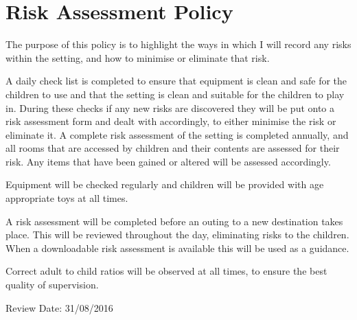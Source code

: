 

\section{Risk Assessment Policy}

The purpose of this policy is to highlight the ways in which I will
record any risks within the setting, and how to minimise or eliminate
that risk.

A daily check list is completed to ensure that equipment is clean and
safe for the children to use and that the setting is clean and suitable
for the children to play in. During these checks if any new risks are
discovered they will be put onto a risk assessment form and dealt with
accordingly, to either minimise the risk or eliminate it. A complete
risk assessment of the setting is completed annually, and all rooms that
are accessed by children and their contents are assessed for their risk.
Any items that have been gained or altered will be assessed accordingly.

Equipment will be checked regularly and children will be provided with
age appropriate toys at all times.

A risk assessment will be completed before an outing to a new
destination takes place. This will be reviewed throughout the day,
eliminating risks to the children. When a downloadable risk assessment
is available this will be used as a guidance.

Correct adult to child ratios will be observed at all times, to ensure
the best quality of supervision.

Review Date: 31/08/2016


